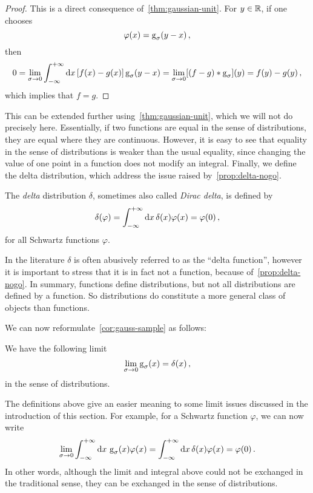 \begin{proof}
  This is a direct consequence of~\cref{thm:gaussian-unit}. For $y\in\mathbb{R}$, if one chooses
  \begin{equation}
    \varphi(x)=\operatorname{g}_{\sigma}(y-x)\,,
  \end{equation}
  then
  \begin{equation}
    0=\lim_{\sigma\to 0}\int_{-\infty}^{+\infty}\mathrm{d}{x}\,[f(x)-g(x)]\operatorname{g}_{\sigma}(y-x)=
    \lim_{\sigma\to 0}[(f-g)\ast\operatorname{g}_{\sigma}](y)=f(y)-g(y)\,,
  \end{equation}
  which implies that $f=g$.
\end{proof}
This can be extended further using~\cref{thm:gaussian-unit}, which we will not do
precisely here. Essentially, if two functions are equal in the sense of distributions,
they are equal where they are continuous. However, it is easy to see that equality in the
sense of distributions is weaker than the usual equality, since changing the value of one
point in a function does not modify an integral. Finally, we define the delta
distribution, which address the issue raised by~\cref{prop:delta-nogo}.
\begin{definition}
  \label{def:delta}
  The \emph{delta} distribution $\delta$, sometimes also called \emph{Dirac delta}, is
  defined by
  \begin{equation}
    \delta(\varphi)=\int_{-\infty}^{+\infty}\mathrm{d}{x}\,\delta(x)\varphi(x)=\varphi(0)\,,
  \end{equation}
  for all Schwartz functions $\varphi$.
\end{definition}
In the literature $\delta$ is often abusively referred to as the ``delta function'',
however it is important to stress that it is in fact not a function, because
of~\cref{prop:delta-nogo}. In summary, functions define distributions, but not all
distributions are defined by a function. So distributions do constitute a more general
class of objects than functions.

We can now reformulate~\cref{cor:gauss-sample} as follows:
\begin{proposition}
  We have the following limit
  \begin{equation}
    \lim_{\sigma\to 0}\operatorname{g}_{\sigma}(x)=\delta(x)\,,
  \end{equation}
  in the sense of distributions.
\end{proposition}
The definitions above give an easier meaning to some limit issues discussed in the
introduction of this section. For example, for a Schwartz function $\varphi$, we can now
write
\begin{equation}
  \lim_{\sigma\to 0}\int_{-\infty}^{+\infty}\mathrm{d}{x}\,\operatorname{g}_{\sigma}(x)\varphi(x)=\int_{-\infty}^{+\infty}\mathrm{d}{x}\,\delta(x)\varphi(x)
  =\varphi(0)\,.
\end{equation}
In other words, although the limit and integral above could not be exchanged in the
traditional sense, they can be exchanged in the sense of distributions.
